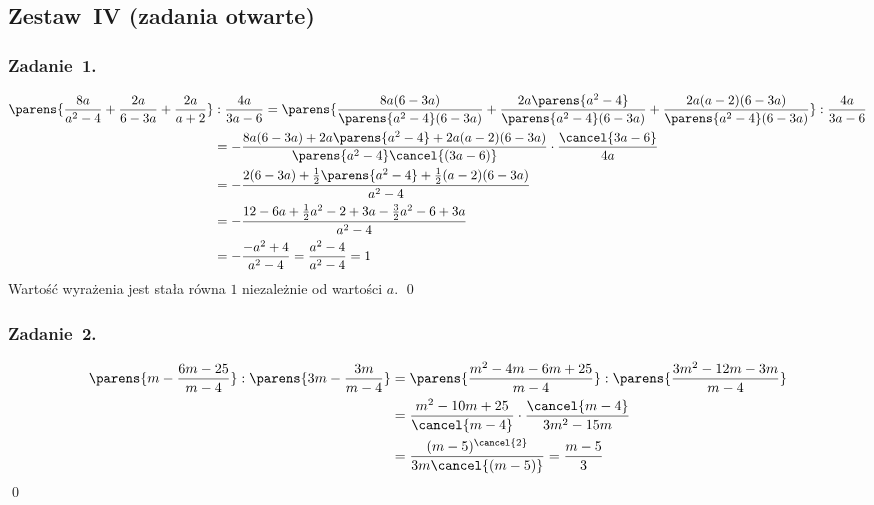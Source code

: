 \subsection*{Zestaw~IV (zadania otwarte)}
\subsubsection*{Zadanie~1.}
\begin{equation*}
    \begin{split}
        \parens{\frac{8a}{a^2 - 4} + \frac{2a}{6 - 3a} + \frac{2a}{a + 2}} &: \frac{4a}{3a - 6}
            = \parens{\frac{8a(6 - 3a)}{\parens{a^2 - 4}(6 - 3a)} + \frac{2a\parens{a^2 - 4}}{\parens{a^2 - 4}(6 - 3a)} + \frac{2a(a - 2)(6 - 3a)}{\parens{a^2 - 4}(6 - 3a)}} : \frac{4a}{3a - 6}\\
            &= -\frac{8a(6 - 3a) + 2a\parens{a^2 - 4} + 2a(a - 2)(6 - 3a)}{\parens{a^2 - 4}\cancel{(3a - 6)}} \cdot \frac{\cancel{3a - 6}}{4a}\\
            &= -\frac{2(6 - 3a) + \frac{1}{2}\parens{a^2 - 4} + \frac{1}{2}(a - 2)(6 - 3a)}{a^2 - 4}\\
            &= -\frac{12 - 6a + \frac{1}{2}a^2 - 2 + 3a - \frac{3}{2}a^2 - 6 + 3a}{a^2 - 4}\\
            &= -\frac{-a^2 + 4}{a^2 - 4}
            = \frac{a^2 - 4}{a^2 - 4}
            = 1
    \end{split}
\end{equation*}
Wartość wyrażenia jest stała równa \(1\) niezależnie od wartości \(a\).
\qed
\subsubsection*{Zadanie~2.}
\begin{equation*}
    \begin{split}
        \parens{m - \frac{6m - 25}{m - 4}} : \parens{3m - \frac{3m}{m - 4}}
            &= \parens{\frac{m^2 - 4m - 6m + 25}{m - 4}} : \parens{\frac{3m^2 - 12m - 3m}{m - 4}}\\
            &= \frac{m^2 - 10m + 25}{\cancel{m - 4}} \cdot \frac{\cancel{m - 4}}{3m^2 - 15m}\\
            &= \frac{(m - 5)^{\cancel{2}}}{3m\cancel{(m - 5)}} = \frac{m - 5}{3}
    \end{split}
\end{equation*}
\qed
